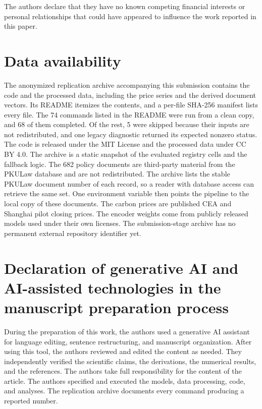 The authors declare that they have no known competing financial interests or personal relationships that could have appeared to influence the work reported in this paper.

\section*{Data availability}

The anonymized replication archive accompanying this submission contains the code and the processed data, including the price series and the derived document vectors. Its README itemizes the contents, and a per-file SHA-256 manifest lists every file. The 74 commands listed in the README were run from a clean copy, and 68 of them completed. Of the rest, 5 were skipped because their inputs are not redistributed, and one legacy diagnostic returned its expected nonzero status. The code is released under the MIT License and the processed data under CC BY 4.0. The archive is a static snapshot of the evaluated registry cells and the fallback logic. The 682 policy documents are third-party material from the PKULaw database and are not redistributed. The archive lists the stable PKULaw document number of each record, so a reader with database access can retrieve the same set. One environment variable then points the pipeline to the local copy of these documents. The carbon prices are published CEA and Shanghai pilot closing prices. The encoder weights come from publicly released models used under their own licenses. The submission-stage archive has no permanent external repository identifier yet.

\section*{Declaration of generative AI and AI-assisted technologies in the manuscript preparation process}

During the preparation of this work, the authors used a generative AI assistant for language editing, sentence restructuring, and manuscript organization. After using this tool, the authors reviewed and edited the content as needed. They independently verified the scientific claims, the derivations, the numerical results, and the references. The authors take full responsibility for the content of the article. The authors specified and executed the models, data processing, code, and analyses. The replication archive documents every command producing a reported number.
